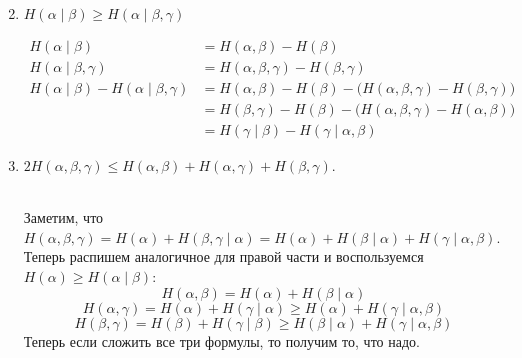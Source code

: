 \begin{prop}
\begin{enumerate}
\begin{proof*}
\begin{align*}
    			\end{align*}
			\end{proof*}
		\item $ H( \alpha \mid \beta) \ge H( \alpha  \mid \beta, \gamma ) $
		    \begin{proof*}
		        \begin{align*}
		            H(\alpha \mid \beta) &= H(\alpha, \beta) - H(\beta)\\
		            H(\alpha \mid \beta, \gamma) &= H(\alpha, \beta, \gamma) - H(\beta, \gamma)\\
		            H(\alpha \mid \beta) - H(\alpha \mid \beta, \gamma) &= H(\alpha, \beta) - H(\beta) - \Big(H(\alpha, \beta, \gamma) - H(\beta, \gamma)\Big) \\
		            &=  H(\beta, \gamma) - H(\beta) - \Big(H(\alpha, \beta, \gamma) - H(\alpha, \beta)\Big) \\
		            &= H(\gamma \mid \beta) - H(\gamma \mid \alpha, \beta)
		        \end{align*}
		    \end{proof*}
		\item 
			$ 2H( \alpha , \beta , \gamma ) \le H( \alpha , \beta ) + H( \alpha,  \gamma ) + H( \beta , \gamma ).$
		\begin{proof*}
        \\
		 Заметим, что $H(\alpha, \beta, \gamma) = H(\alpha) + H(\beta, \gamma \mid \alpha) = H(\alpha) + H(\beta \mid \alpha) + H(\gamma \mid \alpha, \beta)$.\\
		 Теперь распишем аналогичное для правой части и воспользуемся $H(\alpha) \ge H(\alpha \mid \beta)$:
		 \[
		    H(\alpha, \beta) = H(\alpha) + H(\beta \mid \alpha)
		 \]
		 \[
		    H(\alpha, \gamma) = H(\alpha) + H(\gamma \mid \alpha) \ge H(\alpha) + H(\gamma \mid \alpha, \beta)
		 \]
		 \[
		    H(\beta, \gamma) = H(\beta) + H(\gamma \mid \beta) \ge H(\beta \mid \alpha) + H(\gamma \mid \alpha, \beta)
		 \]
		 Теперь если сложить все три формулы, то получим то, что надо.
		\end{proof*}
		
    \end{enumerate} 
\end{prop}

